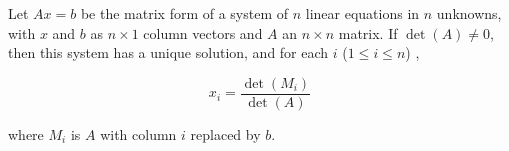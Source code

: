 \documentclass[12pt]{article}
\begin{document}
Let $Ax=b$ be the matrix form of a system of $n$ linear equations in $n$ unknowns, with $x$ and $b$ as $n\times 1$ column vectors and $A$ an $n \times n$ matrix. If $\det(A)\ne 0$, then this system has a unique solution, and for each $i$ ($1\le i \le n$) ,

$$ x_i = \frac{\det(M_i)}{\det(A)} $$

where $M_i$ is $A$ with column $i$ replaced by $b$.
\end{document}
